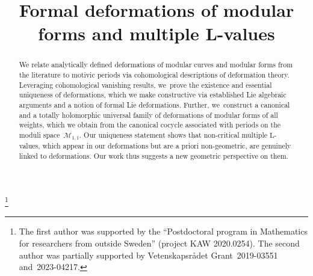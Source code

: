 \documentclass[JEP,XML,SOM,Unicode,published]{cedram}
\theoremstyle{plain}
\theoremstyle{definition}
\begin{document}
\frontmatter
\title{Formal deformations of modular forms and multiple L-values}

\author[\initial{A.} \lastname{Keilthy}]{ }
\address{Chalmers tekniska högskola och Göteborgs Universitet,
Institutionen för Matematiska vetenskaper,\\
SE-412 96 Göteborg, Sweden}

\author[\initial{M.} \lastname{Raum}]{ }
\address{Chalmers tekniska högskola och Göteborgs Universitet,
Institutionen för Matematiska vetenskaper,\\
SE-412 96 Göteborg, Sweden}

\thanks{The first author was supported by the ``Postdoctoral program in Mathematics for researchers from outside Sweden'' (project KAW 2020.0254). The second author was partially supported by Vetenskapsr\aa det Grant~2019-03551 and~2023-04217.}

\begin{abstract}
We relate analytically defined deformations of modular curves and modular forms from the literature to motivic periods via cohomological descriptions of deformation theory. Leveraging cohomological vanishing results, we~prove the existence and essential uniqueness of deformations, which we make constructive via established Lie algebraic arguments and a notion of formal Lie deformations. Further, we~construct a canonical and a totally holomorphic universal family of deformations of modular forms of all weights, which we obtain from the canonical cocycle associated with periods on the moduli space~$\mathcal{M}_{1,1}$. Our uniqueness statement shows that non-critical multiple $\mathrm{L}$-values, which appear in our deformations but are a priori non-geometric, are genuinely linked to deformations. Our work thus suggests a new geometric perspective on them.
\end{abstract}



\end{document}
